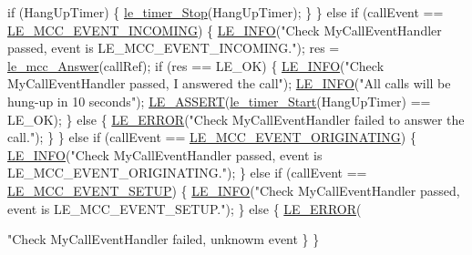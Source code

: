 \begin{DoxyCodeInclude}
{{{{        \textcolor{keywordflow}{if} (HangUpTimer)
        \{
            \hyperlink{le__timer_8h_af310daa378bd6ca39373a47e073f2243}{le\_timer\_Stop}(HangUpTimer);
        \}
    \}
    \textcolor{keywordflow}{else} \textcolor{keywordflow}{if} (callEvent == \hyperlink{le__mcc__interface_8h_aefc4679ffa76d0e04c578572c22f06cfab37936f33d31259ea0c16169ba852bd0}{LE\_MCC\_EVENT\_INCOMING})
    \{
        \hyperlink{le__log_8h_a23e6d206faa64f612045d688cdde5808}{LE\_INFO}(\textcolor{stringliteral}{"Check MyCallEventHandler passed, event is LE\_MCC\_EVENT\_INCOMING."});
        res = \hyperlink{le__mcc__interface_8h_a598349c6ccfa151dbd1d2f2a9c293ca4}{le\_mcc\_Answer}(callRef);
        \textcolor{keywordflow}{if} (res == LE\_OK)
        \{
            \hyperlink{le__log_8h_a23e6d206faa64f612045d688cdde5808}{LE\_INFO}(\textcolor{stringliteral}{"Check MyCallEventHandler passed, I answered the call"});
            \hyperlink{le__log_8h_a23e6d206faa64f612045d688cdde5808}{LE\_INFO}(\textcolor{stringliteral}{"All calls will be hung-up in 10 seconds"});
            \hyperlink{le__log_8h_ac0dbbef91dc0fed449d0092ff0557b39}{LE\_ASSERT}(\hyperlink{le__timer_8h_ada2ce7f8cb1e76ed959e323ae94bbfc0}{le\_timer\_Start}(HangUpTimer) == LE\_OK);
        \}
        \textcolor{keywordflow}{else}
        \{
            \hyperlink{le__log_8h_a353590f91b3143a7ba3a416ae5a50c3d}{LE\_ERROR}(\textcolor{stringliteral}{"Check MyCallEventHandler failed to answer the call."});
        \}
    \}
    \textcolor{keywordflow}{else} \textcolor{keywordflow}{if} (callEvent == \hyperlink{le__mcc__interface_8h_aefc4679ffa76d0e04c578572c22f06cfa1fa56f470ae87b06edb532f9e2b593e0}{LE\_MCC\_EVENT\_ORIGINATING})
    \{
        \hyperlink{le__log_8h_a23e6d206faa64f612045d688cdde5808}{LE\_INFO}(\textcolor{stringliteral}{"Check MyCallEventHandler passed, event is LE\_MCC\_EVENT\_ORIGINATING."});
    \}
    \textcolor{keywordflow}{else} \textcolor{keywordflow}{if} (callEvent == \hyperlink{le__mcc__interface_8h_aefc4679ffa76d0e04c578572c22f06cfa57dc02ca807a7a7c616e947f3651de9f}{LE\_MCC\_EVENT\_SETUP})
    \{
        \hyperlink{le__log_8h_a23e6d206faa64f612045d688cdde5808}{LE\_INFO}(\textcolor{stringliteral}{"Check MyCallEventHandler passed, event is LE\_MCC\_EVENT\_SETUP."});
    \}
    \textcolor{keywordflow}{else}
    \{
        \hyperlink{le__log_8h_a353590f91b3143a7ba3a416ae5a50c3d}{LE\_ERROR}(\textcolor{stringliteral}{"Check MyCallEventHandler failed, unknowm event %
    \}
\}


}}}}}
\end{DoxyCodeInclude}

